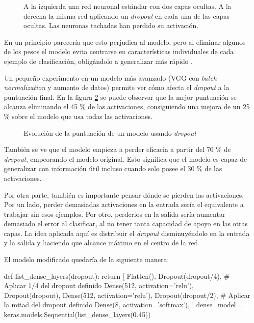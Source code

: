 \begin{figure}
    \caption{A la izquierda una red neuronal estándar con dos capas ocultas. A la derecha la misma red aplicando un \textit{dropout} en cada una de las capas ocultas. Las neuronas tachadas han perdido su activación.}
\label{dropout-net}
\end{figure}

En un principio parecería que esto perjudica al modelo, pero al eliminar algunos de los pesos el modelo evita centrarse en características individuales de cada ejemplo de clasificación, obligándolo a generalizar más rápido \parencite{dropout}.

Un pequeño experimento en un modelo más avanzado (VGG con \textit{batch normalization} y aumento de datos) permite ver cómo afecta el \textit{dropout} a la puntuación final. En la figura \ref{dropout} se puede observar que la mejor puntuación se alcanza eliminando el 45 \% de las activaciones, consiguiendo una mejora de un 25 \% sobre el modelo que usa todas las activaciones.

\begin{figure}
    \caption{Evolución de la puntuación de un modelo usando \textit{dropout}}
\label{dropout}
\end{figure}

También se ve que el modelo empieza a perder eficacia a partir del 70 \% de \textit{dropout}, empeorando el modelo original. Esto significa que el modelo es capaz de generalizar con información útil incluso cuando solo posee el 30 \% de las activaciones.

Por otra parte, también es importante pensar dónde se pierden las activaciones.
Por un lado, perder demasiadas activaciones en la entrada sería el equivalente
a trabajar sin esos ejemplos. Por otro, perderlos en la salida sería aumentar
demasiado el error al clasificar, al no tener tanta capacidad de apoyo en las
otras capas.  La idea aplicada aquí es distribuir el \textit{dropout}
disminuyéndolo en la entrada y la salida y haciendo que alcance máximo
en el centro de la red.

El modelo modificado quedaría de la siguiente manera:

\begin{python}
def list_dense_layers(dropout):
    return [
        Flatten(),
        Dropout(dropout/4),  # Aplicar 1/4 del dropout definido 
        Dense(512, activation='relu'),
        Dropout(dropout),
        Dense(512, activation='relu'),
        Dropout(dropout/2),  # Aplicar la mitad del dropout definido
        Dense(8, activation='softmax'),
    ]
dense_model = keras.models.Sequential(list_dense_layers(0.45))
\end{python}


